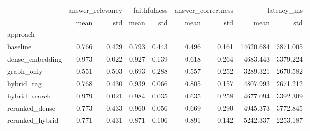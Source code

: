 \begin{tabular}{lrrrrrrrr}
\toprule
 & \multicolumn{2}{r}{answer_relevancy} & \multicolumn{2}{r}{faithfulness} & \multicolumn{2}{r}{answer_correctness} & \multicolumn{2}{r}{latency_ms} \\
 & mean & std & mean & std & mean & std & mean & std \\
approach &  &  &  &  &  &  &  &  \\
\midrule
baseline & 0.766 & 0.429 & 0.793 & 0.443 & 0.496 & 0.161 & 14620.684 & 3871.005 \\
dense_embedding & 0.973 & 0.022 & 0.927 & 0.139 & 0.618 & 0.264 & 4683.443 & 3379.224 \\
graph_only & 0.551 & 0.503 & 0.693 & 0.288 & 0.557 & 0.252 & 3289.321 & 2670.582 \\
hybrid_rag & 0.768 & 0.430 & 0.939 & 0.066 & 0.805 & 0.157 & 4807.993 & 2671.212 \\
hybrid_search & 0.979 & 0.021 & 0.984 & 0.035 & 0.635 & 0.258 & 4677.094 & 3392.309 \\
reranked_dense & 0.773 & 0.433 & 0.960 & 0.056 & 0.669 & 0.290 & 4945.373 & 3772.845 \\
reranked_hybrid & 0.771 & 0.431 & 0.871 & 0.106 & 0.891 & 0.142 & 5242.337 & 2253.187 \\
\bottomrule
\end{tabular}


